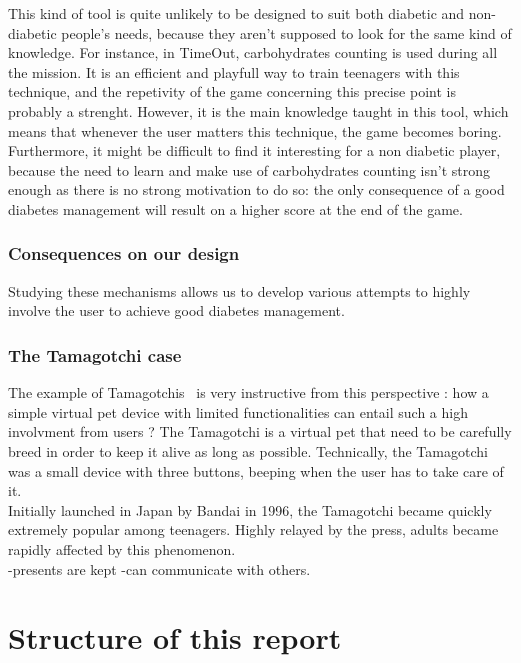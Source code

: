 \documentclass[12pt,MSc]{muthesis}
\begin{document}
This kind of tool is quite unlikely to be designed to suit both diabetic and non-diabetic people's needs, because they aren't supposed to look for the same kind of knowledge. For instance, in TimeOut, carbohydrates counting is used during all the mission. It is an efficient and playfull way to train teenagers with this technique, and the repetivity of the game concerning this precise point is probably a strenght. However, it is the main knowledge taught in this tool, which means that whenever the user matters this technique, the game becomes boring. Furthermore, it might be difficult to find it interesting for a non diabetic player, because the need to learn and make use of carbohydrates counting isn't strong enough as there is no strong motivation to do so: the only consequence of a good diabetes management will result on a higher score at the end of the game.\\

\subsubsection{Consequences on our design}
Studying these mechanisms allows us to develop various attempts to highly involve the user to achieve good diabetes management. 

\subsubsection{The Tamagotchi case}
The example of Tamagotchis~\cite{holzinger2001triangle} is very instructive from this perspective : how a simple virtual pet device with limited functionalities can entail such a high involvment from users ? The Tamagotchi is a virtual pet that need to be carefully breed in order to keep it alive as long as possible. Technically, the Tamagotchi was a small device with three buttons, beeping when the user has to take care of it. \\
Initially launched in Japan by Bandai in 1996, the Tamagotchi became quickly extremely popular among teenagers. Highly relayed by the press, adults became rapidly affected by this phenomenon.\\

-presents are kept
-can communicate with others.
\fi 


\section{Structure of this report}
\end{document}
